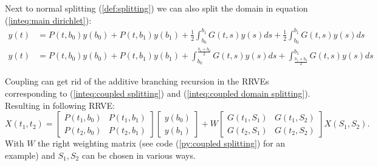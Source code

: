\documentclass[a4paper,12pt]{article}
\begin{document}


\begin{example} \label{ex:coupled splitting}
    Next to normal splitting (\ref{def:splitting}) we can
    also split the domain in equation (\ref{inteq:main dirichlet}):
    \begin{align}\label{inteq:coupled splitting}
        y(t) & = P(t,b_{0}) y(b_{0}) + P(t,b_{1}) y(b_{1}) +
        \frac{1}{2} \int_{b_{0}}^{b_{1}} G(t,s)y(s) ds +
        \frac{1}{2} \int_{b_{0}}^{b_{1}} G(t,s)y(s) ds                                              \\
        y(t) & = P(t,b_{0}) y(b_{0}) + P(t,b_{1}) y(b_{1}) + \label{inteq:coupled domain splitting}
        \int_{b_{0}}^{\frac{b_{1}+b_{0}}{2}} G(t,s)y(s) ds +
        \int_{\frac{b_{1}+b_{0}}{2}}^{b_{1}} G(t,s)y(s) ds
    \end{align}

    Coupling can get rid of the additive branching recursion in the RRVEs corresponding
    to (\ref{inteq:coupled splitting}) and (\ref{inteq:coupled domain splitting}).
    Resulting in following RRVE:
    \begin{equation} \label{RRVE:coupled splitting}
        X(t_{1},t_{2})=
        \begin{bmatrix}
            P(t_{1},b_{0}) & P(t_{1},b_{1}) \\
            P(t_{2},b_{0}) & P(t_{2},b_{1})
        \end{bmatrix}
        \begin{bmatrix}
            y(b_{0}) \\
            y(b_{1})
        \end{bmatrix}
        +
        W
        \begin{bmatrix}
            G(t_{1},S_{1}) & G(t_{1},S_{2}) \\
            G(t_{2},S_{1}) & G(t_{2},S_{2})
        \end{bmatrix}
        X(S_{1},S_{2}).
    \end{equation}
    With $W$ the right weighting matrix (see code (\ref{py:coupled splitting}) for an example)
    and $S_{1},S_{2}$ can be chosen in various ways.
\end{example}
\end{document}
